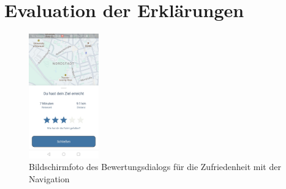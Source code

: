 \newpage

\chapter{Evaluation der Erklärungen}

\begin{figure}[htb!]
    \centering
    \includegraphics[width=0.27\textwidth]{contents/06_model_evaluation/02_evaluation/res/rating_screenshot.jpg}
    \caption{Bildschirmfoto des Bewertungsdialogs für die Zufriedenheit mit der Navigation}
    \label{fig:screenshot_destination_reached}
\end{figure}


